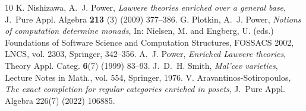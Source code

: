 \documentclass[11pt]{amsart}
\theoremstyle{plain}
\theoremstyle{definition}
\theoremstyle{remark}
\begin{document}
\begin{thebibliography}{10}
 K. Nishizawa, A.~J. Power, \emph{Lawvere theories enriched over a general base}, J.~Pure Appl. Algebra \textbf{213}
(3) (2009) 377--386.
 G. Plotkin, A.~J. Power, \emph{Notions of computation determine monads}, In: Nielsen, M. and Engberg, U. (eds.)
Foundations of Software Science and Computation Structures, FOSSACS 2002, LNCS, vol. 2303, Springer, 342--356.
 A.~J. Power, \emph{Enriched Lawvere theories}, Theory Appl. Categ. \textbf{6}(7) (1999) 83--93.
 J.~D.~H. Smith, \emph{{M}al'cev varieties}, Lecture Notes in Math., vol. 554,  Springer, 1976.
 V. Aravantinos-Sotiropoulos, \emph{The exact completion for regular categories enriched in posets}, {J.~Pure} Appl. Algebra 226(7) (2022) 106885.


\end{thebibliography}
\end{document}
